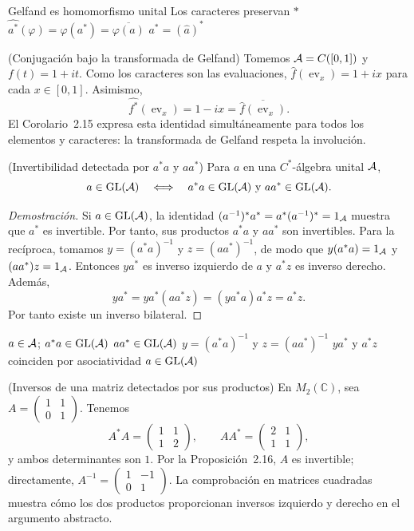 \proofdiagram
{Gelfand es homomorfismo unital}
{Los caracteres preservan $*$}
{$\widehat{a^*}(\varphi)=\varphi(a^*)=\overline{\varphi(a)}$}
{$\widehat{a^*}=(\widehat a)^*$}

\begin{cthejemplo}{(Conjugación bajo la transformada de Gelfand)}
Tomemos $\mathcal A=C([0,1])$ y $f(t)=1+it$. Como los caracteres son las evaluaciones,
$\widehat f(\operatorname{ev}_x)=1+ix$ para cada $x\in[0,1]$. Asimismo,
\[
 \widehat{f^*}(\operatorname{ev}_x)=1-ix
 =\overline{\widehat f(\operatorname{ev}_x)}.
\]
El Corolario~2.15 expresa esta identidad simultáneamente para todos los
elementos y caracteres: la transformada de Gelfand respeta la involución.
\end{cthejemplo}

\begin{cthproposicion}{(Invertibilidad detectada por $a^*a$ y $aa^*$)}
Para $a$ en una $C^*$-álgebra unital $\mathcal A$,
\[
 a\in\operatorname{GL}(\mathcal A)
 \quad\Longleftrightarrow\quad
 a^*a\in\operatorname{GL}(\mathcal A)\text{ y }aa^*\in\operatorname{GL}(\mathcal A).
\]
\end{cthproposicion}

\begin{proof}[Demostración]
Si $a\in\operatorname{GL}(\mathcal A)$, la identidad
$(a^{-1})^*a^*=a^*(a^{-1})^*=1_\mathcal A$ muestra que $a^*$ es invertible.
Por tanto, sus productos $a^*a$ y
$aa^*$ son invertibles. Para la recíproca, tomamos
$y=(a^*a)^{-1}$ y $z=(aa^*)^{-1}$, de modo que
$y(a^*a)=1_\mathcal A$ y $(aa^*)z=1_\mathcal A$. Entonces $ya^*$ es inverso izquierdo de $a$ y $a^*z$ es inverso
derecho. Además,
\[
 ya^*=ya^*(aa^*z)=(ya^*a)a^*z=a^*z.
\]
Por tanto existe un inverso bilateral.
\end{proof}

\proofdiagrambranch
{$a\in\mathcal A$; $a^*a\in\operatorname{GL}(\mathcal A)$}
{$aa^*\in\operatorname{GL}(\mathcal A)$}
{$y=(a^*a)^{-1}$ y $z=(aa^*)^{-1}$}
{$ya^*$ y $a^*z$ coinciden por asociatividad}
{$a\in\operatorname{GL}(\mathcal A)$}

\begin{cthejemplo}{(Inversos de una matriz detectados por sus productos)}
En $M_2(\mathbb C)$, sea
$A=\begin{pmatrix}1&1\\0&1\end{pmatrix}$. Tenemos
\[
 A^*A=\begin{pmatrix}1&1\\1&2\end{pmatrix},
 \qquad
 AA^*=\begin{pmatrix}2&1\\1&1\end{pmatrix},
\]
y ambos determinantes son $1$. Por la Proposición~2.16, $A$ es invertible;
directamente, $A^{-1}=\begin{pmatrix}1&-1\\0&1\end{pmatrix}$.
La comprobación en matrices cuadradas muestra cómo los dos productos
proporcionan inversos izquierdo y derecho en el argumento abstracto.
\end{cthejemplo}

